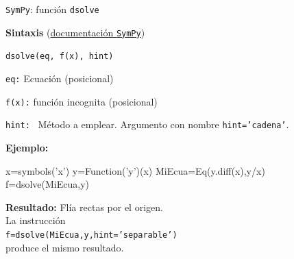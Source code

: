 \documentclass[handout,hyperref={colorlinks=true}]{beamer}
\begin{document}
\begin{frame}[fragile]{\texttt{SymPy}: función \texttt{dsolve}} 

\textbf{Sintaxis} (\href{http://docs.sympy.org/latest/modules/solvers/ode.html#}{documentación \texttt{SymPy}})

\texttt{dsolve(eq, f(x), hint)}

\texttt{eq:} Ecuación (posicional)

\texttt{f(x):} función incognita (posicional)

\texttt{hint: } Método a emplear. Argumento con nombre \texttt{hint='cadena'}.

\textbf{Ejemplo:}

\begin{sageblock}
x=symbols('x')
y=Function('y')(x)
MiEcua=Eq(y.diff(x),y/x)
f=dsolve(MiEcua,y)
\end{sageblock}

\textbf{Resultado:} 
Flía rectas  por el origen. \\
La instrucción\\
\texttt{f=dsolve(MiEcua,y,hint='separable')}
\\produce el mismo resultado.

\end{frame}
\end{document}

